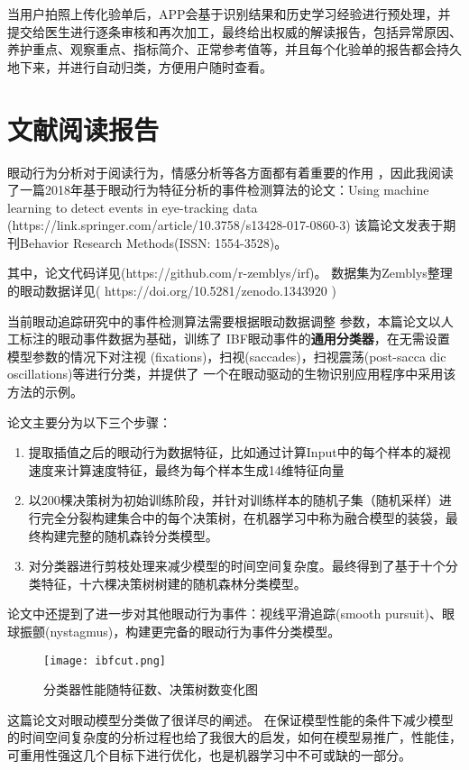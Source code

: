 \documentclass[withoutpreface,bwprint]{cumcmthesis} %
\begin{document}
当用户拍照上传化验单后，APP会基于识别结果和历史学习经验进行预处理，并提交给医生进行逐条审核和再次加工，最终给出权威的解读报告，包括异常原因、养护重点、观察重点、指标简介、正常参考值等，并且每个化验单的报告都会持久地下来，并进行自动归类，方便用户随时查看。
    

\section{文献阅读报告}
眼动行为分析对于阅读行为，情感分析等各方面都有着重要的作用
，因此我阅读了一篇2018年基于眼动行为特征分析的事件检测算法的论文：Using machine learning to detect events in eye-tracking data (https://link.springer.com/article/10.3758/s13428-017-0860-3)
该篇论文发表于期刊Behavior Research Methods(ISSN: 1554-3528)。

其中，论文代码详见(https://github.com/r-zemblys/irf)。
数据集为Zemblys整理的眼动数据详见( https://doi.org/10.5281/zenodo.1343920 )

当前眼动追踪研究中的事件检测算法需要根据眼动数据调整
参数，本篇论文以人工标注的眼动事件数据为基础，训练了
IBF眼动事件的\textbf{通用分类器}，在无需设置模型参数的情况下对注视
(fixations)，扫视(saccades)，扫视震荡(post-sacca
dic oscillations)等进行分类，并提供了
一个在眼动驱动的生物识别应用程序中采用该方法的示例。

论文主要分为以下三个步骤：
\begin{enumerate}
\item 提取插值之后的眼动行为数据特征，比如通过计算Input中的每个样本的凝视速度来计算速度特征，最终为每个样本生成14维特征向量

\item 以200棵决策树为初始训练阶段，并针对训练样本的随机子集（随机采样）进行完全分裂构建集合中的每个决策树，在机器学习中称为融合模型的装袋，最终构建完整的随机森铃分类模型。

\item 对分类器进行剪枝处理来减少模型的时间空间复杂度。最终得到了基于十个分类特征，十六棵决策树树建的随机森林分类模型。
\end{enumerate}

论文中还提到了进一步对其他眼动行为事件：视线平滑追踪(smooth pursuit)、眼球振颤(nystagmus)，构建更完备的眼动行为事件分类模型。
     

\begin{figure}[H]
    \centering
    \texttt{[image: ibfcut.png]}
    \caption{分类器性能随特征数、决策树数变化图}
\end{figure}
这篇论文对眼动模型分类做了很详尽的阐述。
在保证模型性能的条件下减少模型的时间空间复杂度的分析过程也给了我很大的启发，如何在模型易推广，性能佳，可重用性强这几个目标下进行优化，也是机器学习中不可或缺的一部分。
\end{document}
